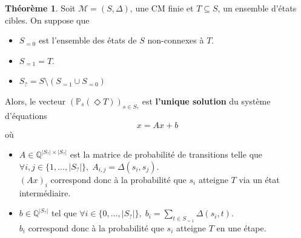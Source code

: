 \documentclass[12pt,a4paper]{report}
\theoremstyle{definition}%
\newtheorem{theorem}{Théorème}[chapter]
\theoremstyle{remark}
\newcommand{\eg}{e.g. }
\newcommand{\pr}{\mathbb{P}}
\let\labelitemi\labelitemii
\begin{document}

\begin{theorem}
	Soit $\mathcal{M} = (S, \Delta)$, une CM finie et $T \subseteq S$, un ensemble d'états cibles. On suppose que
	\begin{itemize}
		\renewcommand{\labelitemi}{\tiny$\bullet$}
		\item $S_{=0}$ est l'ensemble des états de $S$ non-connexes à $T$.
		\item $S_{=1} = T$.
		\item $S_? = S \setminus (S_{=1} \cup S_{=0})$
	\end{itemize}
	Alors, le vecteur $(\pr_s(\Diamond T))_{s \in S_?}$ est \textbf{l'unique solution} du système d'équations
	\[ x = Ax + b \]
	où 
	\begin{itemize}
	\renewcommand{\labelitemi}{\tiny$\bullet$}
	\item $A \in \mathbb{Q}^{|S_?| \times |S_?|}$ est la matrice de probabilité de transitions telle que $\forall i, j \in \{1, \dots, |S_?| \}, \; A_{i, j} = \Delta(s_i, s_j)$. \\ $(Ax)_{i}$ correspond donc à la probabilité que $s_i$ atteigne $T$ via un état intermédiaire.
	\item $b \in \mathbb{Q}^{|S_?|}$ tel que $\forall i \in \{ 0, \dots, |S_?| \}, \; b_i = \sum_{t \in S_{=1}} \Delta(s_i, t)$. \\ $b_{i}$ correspond donc à la probabilité que $s_i$ atteigne $T$ en une étape. 
	\end{itemize}
\end{theorem}
\end{document}
